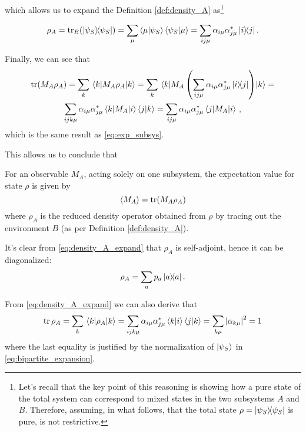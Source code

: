 which allows us to expand the Definition \ref{def:density_A}
as\footnote{
  Let's recall that the key point of this reasoning is showing how
  a pure state of the total system can correspond to mixed states
  in the two subsystems $A$ and $B$. Therefore, assuming, in what follows,
  that the total state $\rho = \ketbra{\psi_S}$ is pure, is not restrictive.
}

\begin{equation}\label{eq:density_A_expand}
  \rho_A = \tr_B(\ketbra{\psi_S}{\psi_S}) =
    \sum_{\mu}\braket{\mu}{\psi_S}\braket{\psi_S}{\mu} =
    \sum_{ij\mu} \alpha_{i\mu}\alpha_{j\mu}^{*}\ketbra{i}{j} \text{.}
\end{equation}

Finally, we can see that
\begin{multline*}
  \tr(M_A \rho_A) = \sum_k \mel{k}{M_A \rho_A}{k} =
    \sum_k \mel {k} {M_A \left(\sum_{ij\mu} \alpha_{i\mu}\alpha_{j\mu}^{*}\ketbra{i}{j}\right)} {k} = \\
    \sum_{ijk\mu} \alpha_{i\mu}\alpha_{j\mu}^{*} \mel{k}{M_A}{i} \braket{j}{k} =
    \sum_{ij\mu} \alpha_{i\mu}\alpha_{j\mu}^{*} \mel{j}{M_A}{i}
    \, \text{,}
\end{multline*}
which is the same result as \eqref{eq:exp_subsys}.

This allows us to conclude that
\begin{proposition}
  For an observable $M_A$, acting solely on one subsystem, the expectation value
  for state $\rho$ is given by
  \begin{equation}
    \expval{M_A} = \tr(M_A \rho_A)
  \end{equation}
  where $\rho_A$ is the reduced density operator obtained from $\rho$ by
  tracing out the environment $B$ (as per Definition \ref{def:density_A}).
\end{proposition}

It's clear from \eqref{eq:density_A_expand} that $\rho_A$ is self-adjoint,
hence it can be diagonalized:
\begin{equation}\label{eq:rho_diag}
  \rho_A = \sum_a p_a \ketbra{a}{a} \text{.}
\end{equation}

From \eqref{eq:density_A_expand} we can also derive that
\begin{equation}
  \tr\rho_A = \sum_k \mel{k}{\rho_A}{k} =
    \sum_{ijk\mu}\alpha_{i\mu}\alpha_{j\mu}^{*}\braket{k}{i}\braket{j}{k} =
    \sum_{k\mu}\abs{\alpha_{k\mu}}^2 = 1
\end{equation}
where the last equality is justified by the normalization of $\ket{\psi_S}$
in \eqref{eq:bipartite_expansion}.

